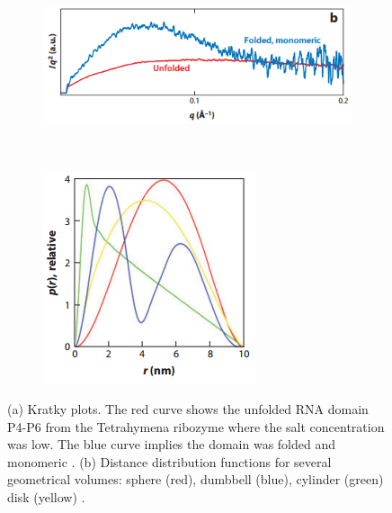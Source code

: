     \begin{figure}
        \centering
        \begin{subfigure}[b]{0.8\textwidth}
                \centering
                \includegraphics[width=\textwidth]{figures/introduction/kratkyplot.png}
                \caption{}
                \label{fig:Kratky plot}
        \end{subfigure}
        \\
        \begin{subfigure}[b]{0.6\textwidth}
                \centering
                \includegraphics[width=\textwidth]{figures/introduction/distancedistribution.png}
                \caption{}
                \label{fig:Distance distribution plot}
        \end{subfigure}
        \caption{(a) Kratky plots.
        The red curve shows the unfolded RNA domain P4-P6 from the Tetrahymena ribozyme where the salt concentration was low.
        The blue curve implies the domain was folded and monomeric \cite{pollack2011saxs}.
        (b) Distance distribution functions for several geometrical volumes: sphere (red),  dumbbell (blue), cylinder (green) disk (yellow) \cite{blanchet2013small}.}
        \label{fig:SAXS structural analysis graphs}
    \end{figure}
